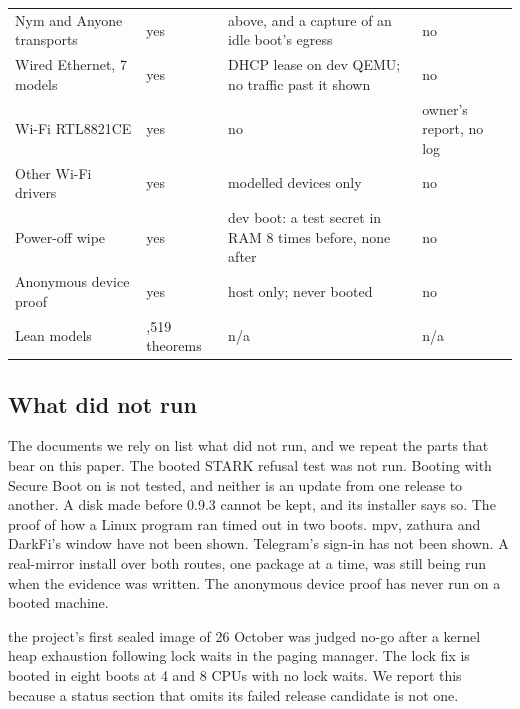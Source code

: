\begin{table}[t]
\begin{tabular}{@{}>{\raggedright\arraybackslash}p{4.3cm}>{\raggedright\arraybackslash}p{2.1cm}>{\raggedright\arraybackslash}p{4.9cm}>{\raggedright\arraybackslash}p{3.1cm}@{}}
Nym and Anyone transports & yes & above, and a capture of an idle boot's egress & no\\
Wired Ethernet, 7 models & yes & DHCP lease on dev QEMU; no traffic past it shown & no\\
Wi-Fi RTL8821CE & yes & no & owner's report, no log\\
Other Wi-Fi drivers & yes & modelled devices only & no\\
Power-off wipe & yes & dev boot: a test secret in RAM 8 times before, none after & no\\
Anonymous device proof & yes & host only; never booted & no\\
Lean models & 1,519 theorems & n/a & n/a\\ \bottomrule
\end{tabular}
\end{table}

\subsection{What did not run}

The documents we rely on list what did not run, and we repeat the parts that bear on this paper. The booted STARK refusal test was not run. Booting with Secure Boot on is not tested, and neither is an update from one release to another. A disk made before 0.9.3 cannot be kept, and its installer says so. The proof of how a Linux program ran timed out in two boots. mpv, zathura and DarkFi's window have not been shown. Telegram's sign-in has not been shown. A real-mirror install over both routes, one package at a time, was still being run when the evidence was written. The anonymous device proof has never run on a booted machine.

the project's first sealed image of 26 October was judged no-go after a kernel heap exhaustion following lock waits in the paging manager. The lock fix is booted in eight boots at 4 and 8 CPUs with no lock waits. We report this because a status section that omits its failed release candidate is not one.
